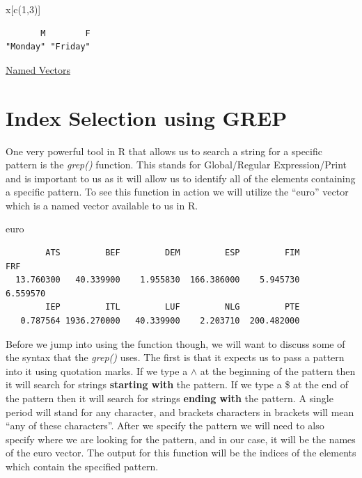 \documentclass[
  letterpaper,
  DIV=11,
  numbers=noendperiod]{scrreprt}
\newenvironment{Shaded}{\begin{snugshade}}{\end{snugshade}}
\newcommand{\DecValTok}[1]{\textcolor[rgb]{0.68,0.00,0.00}{#1}}
\newcommand{\FunctionTok}[1]{\textcolor[rgb]{0.28,0.35,0.67}{#1}}
\newcommand{\NormalTok}[1]{\textcolor[rgb]{0.00,0.23,0.31}{#1}}
\begin{document}
\begin{Shaded}
\begin{Highlighting}[]
\NormalTok{x[}\FunctionTok{c}\NormalTok{(}\DecValTok{1}\NormalTok{,}\DecValTok{3}\NormalTok{)]}
\end{Highlighting}
\end{Shaded}

\begin{verbatim}
       M        F 
"Monday" "Friday" 
\end{verbatim}

\begin{watch}{}{}
    \href{https://youtu.be/uYHuPb60zSA}{Named Vectors}
\end{watch}

\section{Index Selection using GREP}\label{index-selection-using-grep}

One very powerful tool in R that allows us to search a string for a
specific pattern is the \emph{grep()} function. This stands for
Global/Regular Expression/Print and is important to us as it will allow
us to identify all of the elements containing a specific pattern. To see
this function in action we will utilize the ``euro'' vector which is a
named vector available to us in R.

\begin{Shaded}
\begin{Highlighting}[]
\NormalTok{euro}
\end{Highlighting}
\end{Shaded}

\begin{verbatim}
        ATS         BEF         DEM         ESP         FIM         FRF 
  13.760300   40.339900    1.955830  166.386000    5.945730    6.559570 
        IEP         ITL         LUF         NLG         PTE 
   0.787564 1936.270000   40.339900    2.203710  200.482000 
\end{verbatim}

Before we jump into using the function though, we will want to discuss
some of the syntax that the \emph{grep()} uses. The first is that it
expects us to pass a pattern into it using quotation marks. If we type a
\(\wedge\) at the beginning of the pattern then it will search for
strings \textbf{starting with} the pattern. If we type a \$ at the end
of the pattern then it will search for strings \textbf{ending with} the
pattern. A single period will stand for any character, and brackets
characters in brackets will mean ``any of these characters''. After we
specify the pattern we will need to also specify where we are looking
for the pattern, and in our case, it will be the names of the euro
vector. The output for this function will be the indices of the elements
which contain the specified pattern.
\end{document}
